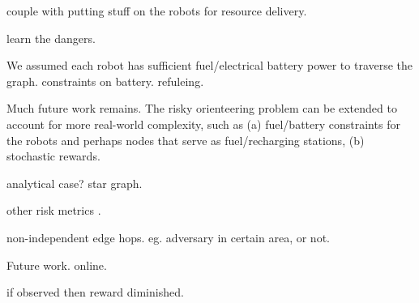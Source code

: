 \documentclass[11pt, oneside]{article}
\begin{document}
couple with putting stuff on the robots for resource delivery.

learn the dangers.

We assumed each robot has sufficient fuel/electrical battery power to traverse the graph.
constraints on battery. refuleing.

Much future work remains.
The risky orienteering problem can be extended to account for more real-world complexity, such as (a) fuel/battery constraints for the robots and perhaps nodes that serve as fuel/recharging stations, (b) stochastic rewards.


analytical case? star graph.

other risk metrics \cite{majumdar2020should}.

non-independent edge hops. eg. adversary in certain area, or not.

Future work. online.

if observed then reward diminished.




\end{document}
